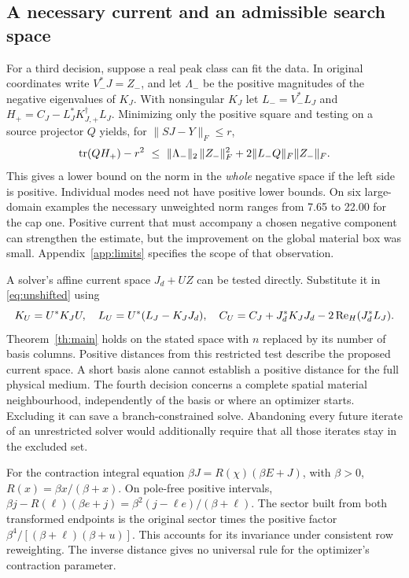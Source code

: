 \subsection{A necessary current and an admissible search space}
For a third decision, suppose a real peak class can fit the data. In original coordinates write $V_-^*J=Z_-$, and let $\Lambda_-$ be the positive magnitudes of the negative eigenvalues of $K_J$. With nonsingular $K_J$ let $L_-=V_-^*L_J$ and $H_+=C_J-L_J^*K_{J,+}^\dagger L_J$. Minimizing only the positive square and testing on a source projector $Q$ yields, for $\|SJ-Y\|_F\le r$,
\begin{equation}
 \operatorname{tr}(QH_+)-r^2 \ \le\
 \|\Lambda_-\|_2\,\|Z_-\|_F^2+2\|L_- Q\|_F\|Z_-\|_F .
 \label{eq:norm}
\end{equation}
This gives a lower bound on the norm in the \emph{whole} negative space if the left side is positive. Individual modes need not have positive lower bounds. On six large-domain examples the necessary unweighted norm ranges from 7.65 to 22.00 for the cap one. Positive current that must accompany a chosen negative component can strengthen the estimate, but the improvement on the global material box was small. Appendix~\ref{app:limits} specifies the scope of that observation.

A solver's affine current space $J_d+UZ$ can be tested directly. Substitute it in \eqref{eq:unshifted} using
\[
 K_U=U^*K_JU,\quad L_U=U^*(L_J-K_JJ_d),\quad
 C_U=C_J+J_d^*K_JJ_d-2\operatorname{Re}_{H}(J_d^*L_J).
\]
Theorem~\ref{th:main} holds on the stated space with $n$ replaced by its number of basis columns. Positive distances from this restricted test describe the proposed current space. A short basis alone cannot establish a positive distance for the full physical medium. The fourth decision concerns a complete spatial material neighbourhood, independently of the basis or where an optimizer starts. Excluding it can save a branch-constrained solve. Abandoning every future iterate of an unrestricted solver would additionally require that all those iterates stay in the excluded set.

For the contraction integral equation $\beta J=R(\chi)(\beta E+J)$, with $\beta>0$, $R(x)=\beta x/(\beta+x)$. On pole-free positive intervals,
$\beta j-R(\ell)(\beta e+j)=\beta^2(j-\ell e)/(\beta+\ell)$.
The sector built from both transformed endpoints is the original sector times the positive factor $\beta^4/[(\beta+\ell)(\beta+u)]$. This accounts for its invariance under consistent row reweighting. The inverse distance gives no universal rule for the optimizer's contraction parameter.

